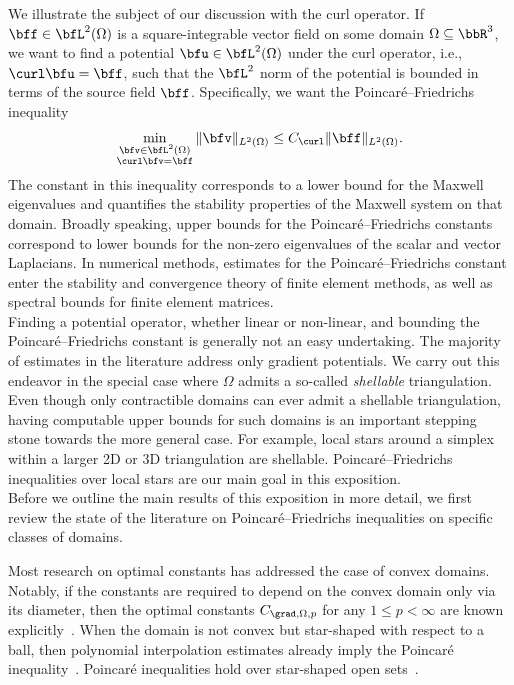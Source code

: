 We illustrate the subject of our discussion with the curl operator. 
If $\bff \in \bfL^{2}(\Omega)$ is a square-integrable vector field on some domain $\Omega \subseteq \bbR^3$, 
we want to find a potential $\bfu \in \bfL^2(\Omega)$ under the curl operator, i.e., $\curl \bfu = \bff$, such that the $\bfL^2$ norm of the potential is bounded in terms of the source field $\bff$. Specifically, we want the Poincar\'e--Friedrichs inequality %
\begin{align*}
    \min\limits_{ \substack{ \bfv \in \bfL^{2}(\Omega) \\ \curl \bfv = \bff } } \| \bfv \|_{L^{2}(\Omega)}
    \leq 
    C_{\curl}
    \| \bff \|_{L^{2}(\Omega)}
    .
\end{align*}
The constant in this inequality corresponds to a lower bound for the Maxwell eigenvalues and quantifies the stability properties of the Maxwell system on that domain. 
Broadly speaking, upper bounds for the Poincar\'e--Friedrichs constants correspond to lower bounds for the non-zero eigenvalues of the scalar and vector Laplacians.
In numerical methods, estimates for the Poincar\'e--Friedrichs constant enter the stability and convergence theory of finite element methods, as well as spectral bounds for finite element matrices. 
\\

Finding a potential operator, whether linear or non-linear, and bounding the Poincar\'e--Friedrichs constant is generally not an easy undertaking. 
The majority of estimates in the literature address only gradient potentials. 
We carry out this endeavor in the special case where $\Omega$ admits a so-called \emph{shellable} triangulation. 
Even though only contractible domains can ever admit a shellable triangulation, 
having computable upper bounds for such domains is an important stepping stone towards the more general case. 
For example, local stars around a simplex within a larger 2D or 3D triangulation are shellable.
Poincar\'e--Friedrichs inequalities over local stars are our main goal in this exposition. 
\\


Before we outline the main results of this exposition in more detail, 
we first review the state of the literature on Poincar\'e--Friedrichs inequalities on specific classes of domains. 


Most research on optimal constants has addressed the case of convex domains. 
Notably, if the constants are required to depend on the convex domain only via its diameter, 
then the optimal constants $C_{\grad,\Omega,p}$ for any $1 \leq p < \infty$ are known explicitly~\cite{bebendorf2003note,acosta2004optimal,esposito2013poincare,ferone2012remark}.
When the domain is not convex but star-shaped with respect to a ball,
then polynomial interpolation estimates already imply the Poincar\'e inequality~\cite{brenner2008mathematical,ern2021finite}. 
Poincar\'e inequalities hold over star-shaped open sets~\cite[Theorem~3.1]{hurri1988poincare}. %

